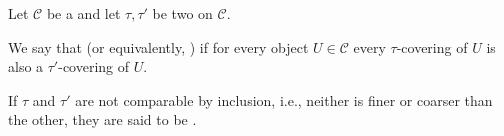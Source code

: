 \begin{definition} \label{definition:coarser_and_finer_grothendieck_topologies}
    Let $\mathcal{C}$ be a  and let $\tau, \tau'$ be two  on $\mathcal{C}$.

    We say that  (or equivalently, ) if for every object $U \in \mathcal{C}$ every $\tau$-covering of $U$ is also a $\tau'$-covering of $U$.

    If $\tau$ and $\tau'$ are not comparable by inclusion, i.e., neither is finer or coarser than the other, they are said to be .
\end{definition}